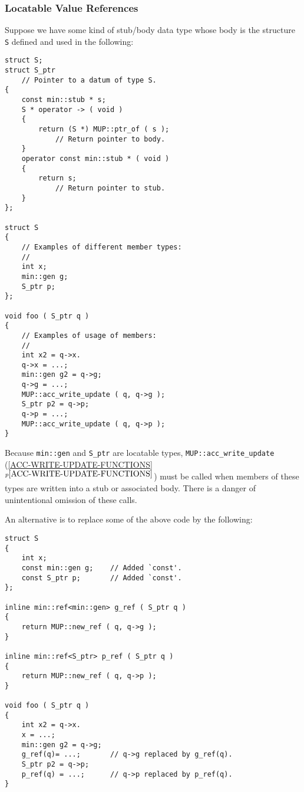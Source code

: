 \documentclass[12pt]{article}
\newcommand{\itemref}[1]{\ref{#1}$^{p\pageref{#1}}$}
\newcommand{\EOL}{\penalty \exhyphenpenalty}
\newenvironment{indpar}[1][0.3in]%
	{\begin{list}{}%
		     {\setlength{\itemsep}{0in}%
		      \setlength{\topsep}{0in}%
		      \setlength{\parsep}{1ex}%
		      \setlength{\labelwidth}{#1}%
		      \setlength{\leftmargin}{#1}%
		      \addtolength{\leftmargin}{\labelsep}}%
	 \item}%
	{\end{list}}
\begin{document}
\subsubsection{Locatable Value References}
\label{LOCATABLE-VALUE-REFERENCES}

Suppose we have some kind of stub/body data type whose body
is the structure {\tt S} defined and used in the following:

\begin{indpar}\begin{verbatim}
struct S;
struct S_ptr
    // Pointer to a datum of type S.
{
    const min::stub * s;
    S * operator -> ( void )
    {
        return (S *) MUP::ptr_of ( s );
            // Return pointer to body.
    }
    operator const min::stub * ( void )
    {
        return s;
            // Return pointer to stub.
    }
};

struct S
{
    // Examples of different member types:
    //
    int x;
    min::gen g;
    S_ptr p;
};

void foo ( S_ptr q )
{
    // Examples of usage of members:
    //
    int x2 = q->x.
    q->x = ...;
    min::gen g2 = q->g;
    q->g = ...;
    MUP::acc_write_update ( q, q->g );
    S_ptr p2 = q->p;
    q->p = ...;
    MUP::acc_write_update ( q, q->p );
}
\end{verbatim}\end{indpar}

Because {\tt min::gen} and {\tt S\_ptr} are locatable types,
{\tt MUP::\EOL acc\_\EOL write\_\EOL update}
(\itemref{ACC-WRITE-UPDATE-FUNCTIONS}) must be called when
members of these types are written into a stub or associated body.  There is
a danger of unintentional omission of these calls.

An alternative is to replace some of the above code by the following:

\begin{indpar}\begin{verbatim}
struct S
{
    int x;
    const min::gen g;    // Added `const'.
    const S_ptr p;       // Added `const'.
};

inline min::ref<min::gen> g_ref ( S_ptr q )
{
    return MUP::new_ref ( q, q->g );
}

inline min::ref<S_ptr> p_ref ( S_ptr q )
{
    return MUP::new_ref ( q, q->p );
}

void foo ( S_ptr q )
{
    int x2 = q->x.
    x = ...;
    min::gen g2 = q->g;
    g_ref(q)= ...;       // q->g replaced by g_ref(q).
    S_ptr p2 = q->p;
    p_ref(q) = ...;      // q->p replaced by p_ref(q).
}
\end{verbatim}\end{indpar}
\end{document}
